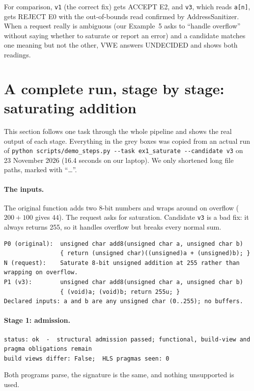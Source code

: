\documentclass[10pt,a4paper]{article}
\begin{document}
\smallskip\noindent For comparison, \texttt{v1} (the correct fix) gets ACCEPT E2, and \texttt{v3},
which reads \texttt{a[n]}, gets REJECT E0 with the out-of-bounds read confirmed by AddressSanitizer.
When a request really is ambiguous (our Example~5 asks to ``handle overflow'' without saying whether
to saturate or report an error) and a candidate matches one meaning but not the other, VWE answers
UNDECIDED and shows both readings.

\section{A complete run, stage by stage: saturating addition}
\label{sec:walk}
This section follows one task through the whole pipeline and shows the real output of each stage.
Everything in the grey boxes was copied from an actual run of
\texttt{python scripts/demo\_steps.py -{}-task ex1\_saturate -{}-candidate v3} on 23 November 2026
(16.4 seconds on our laptop). We only shortened long file paths, marked with ``\ldots''.

\paragraph{The inputs.} The original function adds two 8-bit numbers and wraps around on overflow
($200+100$ gives $44$). The request asks for saturation. Candidate \texttt{v3} is a bad fix: it
always returns 255, so it handles overflow but breaks every normal sum.
\begin{lstlisting}[language={}]
P0 (original):  unsigned char add8(unsigned char a, unsigned char b)
                { return (unsigned char)((unsigned)a + (unsigned)b); }
N (request):    Saturate 8-bit unsigned addition at 255 rather than wrapping on overflow.
P1 (v3):        unsigned char add8(unsigned char a, unsigned char b)
                { (void)a; (void)b; return 255u; }
Declared inputs: a and b are any unsigned char (0..255); no buffers.
\end{lstlisting}

\paragraph{Stage 1: admission.}\mbox{}\par
\begin{lstlisting}[language={}]
status: ok  -  structural admission passed; functional, build-view and pragma obligations remain
build views differ: False;  HLS pragmas seen: 0
\end{lstlisting}
Both programs parse, the signature is the same, and nothing unsupported is used.
\end{document}
